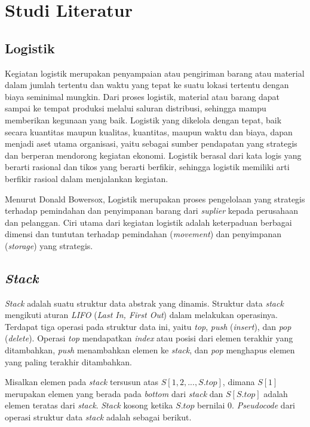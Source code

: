 \chapter{Studi Literatur}

\section{Logistik}

Kegiatan logistik merupakan penyampaian atau pengiriman barang atau material dalam 
jumlah tertentu dan waktu yang tepat ke suatu lokasi tertentu dengan biaya seminimal 
mungkin. Dari proses logistik, material atau barang dapat sampai ke tempat produksi 
melalui saluran distribusi, sehingga mampu memberikan kegunaan yang baik. Logistik yang 
dikelola dengan tepat, baik secara kuantitas maupun kualitas, kuantitas, maupun waktu 
dan biaya, dapan menjadi aset utama organisasi, yaitu sebagai sumber pendapatan yang 
strategis dan berperan mendorong kegiatan ekonomi. Logistik berasal dari kata logis yang 
berarti rasional dan tikos yang berarti berfikir, sehingga logistik memiliki arti 
berfikir rasioal dalam menjalankan kegiatan. 

Menurut Donald Bowersox, Logistik merupakan proses pengelolaan yang strategis terhadap 
pemindahan dan penyimpanan barang dari \textit{suplier} kepada perusahaan dan 
pelanggan. Ciri utama dari kegiatan logistik adalah keterpaduan berbagai dimensi dan 
tuntutan terhadap pemindahan (\textit{movement}) dan penyimpanan (\textit{storage}) yang 
strategis.


\section{\textit{Stack}}

\textit{Stack} adalah suatu struktur data abstrak yang dinamis. Struktur data \textit{stack}
mengikuti aturan \textit{LIFO} (\textit{Last In, First Out}) dalam melakukan operasinya. Terdapat
tiga operasi pada struktur data ini, yaitu \textit{top}, \textit{push} (\textit{insert}), dan
\textit{pop} (\textit{delete}). Operasi \textit{top} mendapatkan \textit{index} atau posisi dari
elemen terakhir yang ditambahkan, \textit{push} menambahkan elemen ke \textit{stack}, dan
\textit{pop} menghapus elemen yang paling terakhir ditambahkan.

Misalkan elemen pada \textit{stack} tersusun atas $S[1, 2, ..., S.top]$, dimana $S[1]$ 
merupakan elemen yang berada pada \textit{bottom} dari \textit{stack} dan $S[S.top]$ 
adalah elemen teratas dari \textit{stack}. \textit{Stack} kosong ketika $S.top$ bernilai 
0. \textit{Pseudocode} dari operasi struktur data \textit{stack} adalah sebagai berikut.

